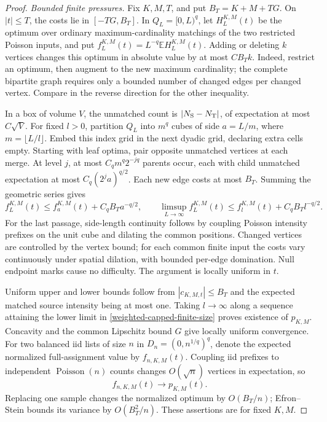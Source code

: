 \documentclass[11pt,reqno]{amsart}
\theoremstyle{definition}
\theoremstyle{remark}
\numberwithin{equation}{section}
\newcommand{\E}{\mathbb E}
\begin{document}
\begin{proof}
\emph{Bounded finite pressures.}
Fix \(K,M,T\), and put \(B_T=K+M+TG\). On \(|t|\le T\),
the costs lie in \([-TG,B_T]\). In \(Q_L=[0,L)^q\), let
\(H_L^{K,M}(t)\) be the optimum over ordinary maximum-cardinality
matchings of the two restricted Poisson inputs, and put
\(f_L^{K,M}(t)=L^{-q}\E H_L^{K,M}(t)\).
Adding or deleting \(k\) vertices changes this optimum in absolute
value by at most \(C B_Tk\). Indeed, restrict an optimum, then
augment to the new maximum cardinality; the complete bipartite graph
requires only a bounded number of changed edges per changed vertex.
Compare in the reverse direction for the other inequality.

In a box of volume \(V\), the unmatched count is
\(|N_{\rm S}-N_{\rm T}|\), of expectation at most \(C\sqrt V\).
For fixed \(l>0\), partition \(Q_L\) into \(m^q\) cubes of side
\(a=L/m\), where \(m=\lfloor L/l\rfloor\). Embed this index
grid in the next dyadic grid, declaring extra cells empty. Starting
with leaf optima, pair opposite unmatched vertices at each merge.
At level \(j\), at most \(C_qm^q2^{-jq}\) parents occur, each
with child unmatched expectation at most \(C_q(2^ja)^{q/2}\).
Each new edge costs at most \(B_T\). Summing the geometric series gives
\begin{equation}
\label{weighted-capped-finite-size}
 f_L^{K,M}(t)\le f_a^{K,M}(t)+C_qB_Ta^{-q/2},\qquad
 \limsup_{L\to\infty}f_L^{K,M}(t)
                  \le f_l^{K,M}(t)+C_qB_Tl^{-q/2}.
\end{equation}
For the last passage, side-length continuity follows by coupling
Poisson intensity prefixes on the unit cube and dilating the common
positions. Changed vertices are controlled by the vertex bound; for
each common finite input the costs vary continuously under spatial
dilation, with bounded per-edge domination. Null endpoint marks cause
no difficulty. The argument is locally uniform in \(t\).

Uniform upper and lower bounds follow from \(|c_{K,M,t}|\le B_T\)
and the expected matched source intensity being at most one. Taking
\(l\to\infty\) along a sequence attaining the lower limit in
\eqref{weighted-capped-finite-size} proves existence of \(p_{K,M}\).
Concavity and the common Lipschitz bound \(G\) give locally uniform
convergence. For two balanced iid lists of size \(n\) in
\(D_n=(0,n^{1/q})^q\), denote the expected normalized full-assignment
value by \(f_{n,K,M}(t)\). Coupling iid prefixes to independent
\(\operatorname{Poisson}(n)\) counts changes \(O(\sqrt n)\)
vertices in expectation, so
\begin{equation}
\label{weighted-capped-iid-limit}
             f_{n,K,M}(t)\longrightarrow p_{K,M}(t).
\end{equation}
Replacing one sample changes the normalized optimum by \(O(B_T/n)\);
Efron--Stein bounds its variance by \(O(B_T^2/n)\). These assertions
are for fixed \(K,M\).


\end{proof}
\end{document}
